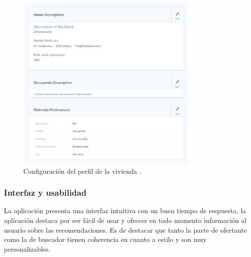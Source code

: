 \begin{figure}[H]
    \centering
    \includegraphics[width=0.8\textwidth]{fotos/home-flatmate.png}
    \caption{Configuración del perfil de la vivienda \textbf{}.}
\end{figure}
\subsubsection*{Interfaz y usabilidad}
La aplicación presenta una interfaz intuitiva con un buen tiempo de respuesta, la aplicación destaca por ser fácil de usar y ofrecer en todo momento información al usuario sobre las recomendaciones. Es de destacar que tanto la parte de ofertante como la de buscador tienen coherencia en cuanto a estilo y son muy personalizables.


